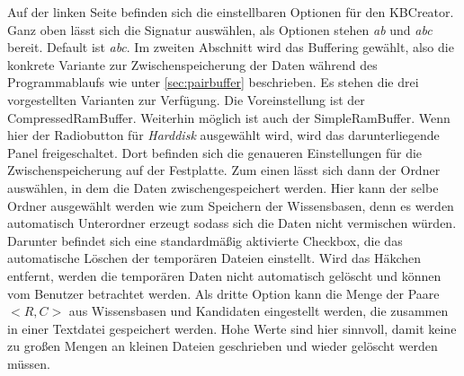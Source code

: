 \documentclass[12pt,a4paper]{article}
\begin{document}
Auf der linken Seite befinden sich die einstellbaren Optionen für den KBCreator. Ganz oben lässt sich die Signatur auswählen, als Optionen stehen \textit{ab} und \textit{abc} bereit. Default ist \textit{abc}. Im zweiten Abschnitt wird das Buffering gewählt, also die konkrete Variante zur Zwischenspeicherung der Daten während des Programmablaufs wie unter \autoref{sec:pairbuffer} beschrieben. Es stehen die drei vorgestellten Varianten zur Verfügung. Die Voreinstellung ist der CompressedRamBuffer. Weiterhin möglich ist auch der SimpleRamBuffer. Wenn hier der Radiobutton für \textit{Harddisk} ausgewählt wird, wird das darunterliegende Panel freigeschaltet. Dort befinden sich die genaueren Einstellungen für die Zwischenspeicherung auf der Festplatte. Zum einen lässt sich dann der Ordner auswählen, in dem die Daten zwischengespeichert werden. Hier kann der selbe Ordner ausgewählt werden wie zum Speichern der Wissensbasen, denn es werden automatisch Unterordner erzeugt sodass sich die Daten nicht vermischen würden. Darunter befindet sich eine standardmäßig aktivierte Checkbox, die das automatische Löschen der temporären Dateien einstellt. Wird das Häkchen entfernt, werden die temporären Daten nicht automatisch gelöscht und können vom Benutzer betrachtet werden. Als dritte Option kann die Menge der Paare $<R,C>$ aus Wissensbasen und Kandidaten eingestellt werden, die zusammen in einer Textdatei gespeichert werden. Hohe Werte sind hier sinnvoll, damit keine zu großen Mengen an kleinen Dateien geschrieben und wieder gelöscht werden müssen. \\
\end{document}

